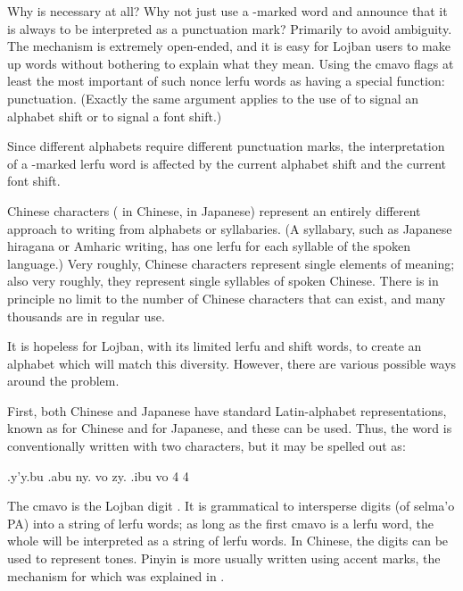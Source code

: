 Why is  necessary at all? Why not just use a
    -marked word and announce that it is always to be
    interpreted as a punctuation mark? Primarily to avoid
    ambiguity. The  mechanism is extremely open-ended, and it
    is easy for Lojban users to make up  words without
    bothering to explain what they mean. Using the  cmavo
    flags at least the most important of such nonce lerfu words as
    having a special function: punctuation. (Exactly the same
    argument applies to the use of  to signal an alphabet
    shift or  to signal a font shift.)

Since different alphabets require different punctuation
    marks, the interpretation of a -marked lerfu word is
    affected by the current alphabet shift and the current font
    shift.



Chinese characters ( in
    Chinese,  in Japanese) represent an entirely different
    approach to writing from alphabets or syllabaries. (A
    syllabary, such as Japanese hiragana or Amharic writing, has
    one lerfu for each syllable of the spoken language.) Very
    roughly, Chinese characters represent single elements of
    meaning; also very roughly, they represent single syllables of
    spoken Chinese. There is in principle no limit to the number of
    Chinese characters that can exist, and many thousands are in
    regular use.

It is hopeless for Lojban, with its limited lerfu and shift
    words, to create an alphabet which will match this diversity.
    However, there are various possible ways around the
    problem.

First, both Chinese and Japanese have standard
    Latin-alphabet representations, known as  for Chinese
    and  for Japanese, and these can be used. Thus, the
    word  is conventionally
    written with two characters, but it may be spelled out as:
\begin{example}
.y'y.bu .abu ny. vo zy. .ibu vo\n
{}   4   4
\end{example}

The cmavo  is the Lojban digit . It is grammatical
    to intersperse digits (of selma'o PA) into a string of lerfu
    words; as long as the first cmavo is a lerfu word, the whole
    will be interpreted as a string of lerfu words. In Chinese, the
    digits can be used to represent tones. Pinyin is more usually
    written using accent marks, the mechanism for which was
    explained in . 

